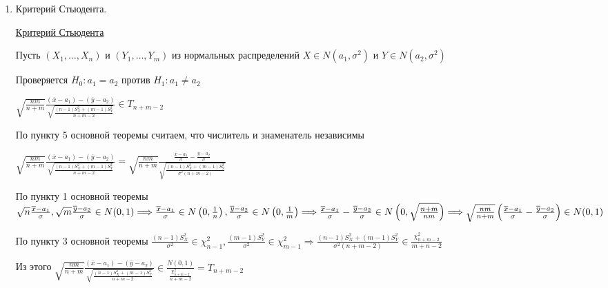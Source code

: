 \documentclass[12pt]{article}
\begin{document}
\begin{enumerate}
    Если нулевая гипотеза отклоняется, то отклоняется общая гипотеза об однородности. А если основная гипотеза принимается, то 
    применяем критерий Стьюдента

    \item Критерий Стьюдента.

    \hyperlink{students_criterion}{Критерий Стьюдента}

    Пусть $(X_1, \dots, X_n)$ и $(Y_1, \dots, Y_m)$ из нормальных распределений $X \in N(a_1, \sigma^2)$ и $Y \in N(a_2, \sigma^2)$

    Проверяется $H_0 : a_1 = a_2$ против $H_1 : a_1 \neq a_2$

    \begin{MyTheorem}
        \Ths $\sqrt{\frac{nm}{n + m}} \frac{(\overline x - a_1) - (\overline y - a_2)}{\sqrt{\frac{(n - 1) S_X^2 + (m - 1) S^2_Y}{n + m - 2}}} \in T_{n + m - 2}$
    \end{MyTheorem}

    \begin{MyProof}
        По пункту 5 основной теоремы считаем, что числитель и знаменатель независимы 

        $\sqrt{\frac{nm}{n + m}} \frac{(\overline x - a_1) - (\overline y - a_2)}{\sqrt{\frac{(n - 1) S_X^2 + (m - 1) S^2_Y}{n + m - 2}}} = 
        \sqrt{\frac{nm}{n + m}} \frac{\frac{\overline x - a_1}{\sigma} - \frac{\overline y - a_2}{\sigma}}{\sqrt{\frac{(n - 1) S_X^2 + (m - 1) S^2_Y}{\sigma^2 (n + m - 2)}}}$

        По пункту 1 основной теоремы $\sqrt{n} \frac{\overline x - a_1}{\sigma}, \sqrt{m} \frac{\overline y - a_2}{\sigma} \in N(0, 1) \Longrightarrow \\
        \frac{\overline x - a_1}{\sigma} \in N\left(0, \frac{1}{n}\right), \frac{\overline y - a_2}{\sigma} \in N\left(0, \frac{1}{m}\right) \Longrightarrow \\
        \frac{\overline x - a_1}{\sigma} - \frac{\overline y - a_2}{\sigma} \in N\left(0, \sqrt{\frac{n + m}{nm}}\right) \Longrightarrow \\
        \sqrt{\frac{nm}{n + m}} \left(\frac{\overline x - a_1}{\sigma} - \frac{\overline y - a_2}{\sigma}\right) \in N(0, 1)$

        По пункту 3 основной теоремы $\frac{(n - 1)S^2_X}{\sigma^2} \in \chi^2_{n - 1}, \frac{(m - 1)S^2_Y}{\sigma^2} \in \chi^2_{m - 1} \Longrightarrow
        \frac{(n - 1) S_X^2 + (m - 1) S^2_Y}{\sigma^2 (n + m - 2)} \in \frac{\chi^2_{n + m - 2}}{m + n - 2}$

        Из этого $\sqrt{\frac{nm}{n + m}} \frac{(\overline x - a_1) - (\overline y - a_2)}{\sqrt{\frac{(n - 1) S_X^2 + (m - 1) S^2_Y}{n + m - 2}}} \in \frac{N(0, 1)}{\frac{\chi^2_{n + m - 2}}{n + m - 2}} = T_{n + m - 2}$
    \end{MyProof}


\end{enumerate}
\end{document}
